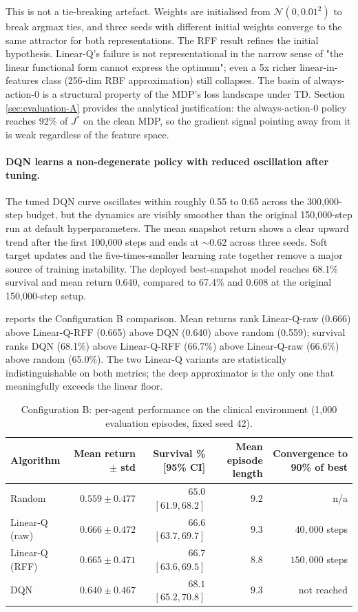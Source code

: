 This is not a tie-breaking artefact. Weights are initialised from $\mathcal{N}(0, 0.01^2)$ to break argmax ties, and three seeds with different initial weights converge to the same attractor for both representations. The RFF result refines the initial hypothesis. Linear-Q's failure is not representational in the narrow sense of "the linear functional form cannot express the optimum"; even a 5x richer linear-in-features class (256-dim RBF approximation) still collapses. The basin of always-action-0 is a structural property of the MDP's loss landscape under TD. Section \ref{sec:evaluation-A} provides the analytical justification: the always-action-0 policy reaches 92\% of $J^*$ on the clean MDP, so the gradient signal pointing away from it is weak regardless of the feature space.

\paragraph{DQN learns a non-degenerate policy with reduced oscillation after tuning.} The tuned DQN curve oscillates within roughly 0.55 to 0.65 across the 300{,}000-step budget, but the dynamics are visibly smoother than the original 150{,}000-step run at default hyperparameters. The mean snapshot return shows a clear upward trend after the first 100{,}000 steps and ends at $\sim 0.62$ across three seeds. Soft target updates and the five-times-smaller learning rate together remove a major source of training instability. The deployed best-snapshot model reaches 68.1\% survival and mean return 0.640, compared to 67.4\% and 0.608 at the original 150{,}000-step setup.

 reports the Configuration B comparison. Mean returns rank Linear-Q-raw (0.666) above Linear-Q-RFF (0.665) above DQN (0.640) above random (0.559); survival ranks DQN (68.1\%) above Linear-Q-RFF (66.7\%) above Linear-Q-raw (66.6\%) above random (65.0\%). The two Linear-Q variants are statistically indistinguishable on both metrics; the deep approximator is the only one that meaningfully exceeds the linear floor.

\begin{table}[!htbp]
\centering
\small
\begin{tabular}{lrrrr}
\toprule
Algorithm & Mean return $\pm$ std & Survival \% [95\% CI] & Mean episode length & Convergence to 90\% of best \\
\midrule
Random            & $0.559 \pm 0.477$ & $65.0$ $[61.9, 68.2]$ & $9.2$ & n/a \\
Linear-Q (raw)    & $0.666 \pm 0.472$ & $66.6$ $[63.7, 69.7]$ & $9.3$ & $40{,}000$ steps \\
Linear-Q (RFF)    & $0.665 \pm 0.471$ & $66.7$ $[63.6, 69.5]$ & $8.8$ & $150{,}000$ steps \\
DQN               & $0.640 \pm 0.467$ & $68.1$ $[65.2, 70.8]$ & $9.3$ & not reached \\
\bottomrule
\end{tabular}
\caption{Configuration B: per-agent performance on the clinical environment (1{,}000 evaluation episodes, fixed seed 42).}
\label{tab:configB-results}
\end{table}

